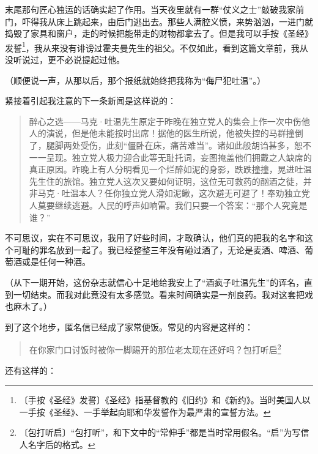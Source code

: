 \documentclass[12pt,UTF-8,openany]{ctexbook}
\begin{document}
\begin{normalsize}
    末尾那句匠心独运的话确实起了作用。当天夜里就有一群“仗义之士”敲破我家前门，吓得我从床上跳起来，由后门逃出去。那些人满腔义愤，来势汹汹，一进门就捣毁了家具和窗户，走的时候把能带走的财物都拿去了。但是我可以手按《圣经》发誓\footnote{〔手按《圣经》发誓〕《圣经》指基督教的《旧约》和《新约》。当时美国人以一手按《圣经》、一手举起向耶和华发誓作为最严肃的宣誓方法。}，我从来没有诽谤过霍夫曼先生的祖父。不仅如此，看到这篇文章前，我从没听说过，更不必说提起过他。
    
    （顺便说一声，从那以后，那个报纸就始终把我称为“侮尸犯吐温”。）
    
    紧接着引起我注意的下一条新闻是这样说的：
    
    \begin{quotation}
    
    醉心之选——马克·吐温先生原定于昨晚在独立党人的集会上作一次中伤他人的演说，但是他未能按时出席！据他的医生所说，他被失控的马群撞倒了，腿脚两处受伤，此刻“僵卧在床，痛苦难当”。诸如此般胡诌甚多，恕不一一呈现。独立党人极力迎合此等无耻托词，妄图掩盖他们拥戴之人缺席的真正原因。昨晚上有人分明看见一个烂醉如泥的身影，跌跌撞撞，晃进吐温先生住的旅馆。独立党人这次又要如何证明，这位无可救药的酗酒之徒，并非马克·吐温本人？任你独立党人滑如泥鳅，这次避无可避了！奉劝独立党人莫要继续逃避。人民的呼声如响雷。我们只要一个答案：“那个人究竟是谁？”
    
    \end{quotation}
    
    不可思议，实在不可思议，我用了好些时间，才敢确认，他们真的把我的名字和这个可耻的罪名放到一起了。我已经整整三年没有碰过酒了，无论是麦酒、啤酒、葡萄酒或是任何一种酒。
    
    （从下一期开始，这份杂志就信心十足地给我安上了“酒疯子吐温先生”的诨名，直到一切结束。而我对此竟没有太多感觉。看来时间确实是一剂良药。我对这套把戏也麻木了。）
    
    到了这个地步，匿名信已经成了家常便饭。常见的内容是这样的：
    
    \begin{quotation}
    
    在你家门口讨饭时被你一脚踢开的那位老太现在还好吗？包打听启\footnote{〔包打听启〕“包打听”，和下文中的“常伸手”都是当时常用假名。“启”为写信人名字后的格式。}
    
    \end{quotation}
    
    还有这样的：
    
    \begin{quotation}
    

\end{quotation}
\end{normalsize}
\end{document}
